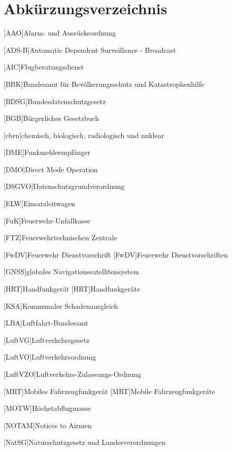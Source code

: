 \newpage
\section{Abkürzungsverzeichnis}

\begin{acronym}[EuGH]

[AAO]{Alarm- und Ausrückeordnung}

[ADS-B]{Automatic Dependent Surveillance - Broadcast}

[AIC]{Flugberatungsdienst}

[BBK]{Bundesamt für Bevölkerungsschutz und Katastrophenhilfe}

[BDSG]{Bundesdatenschutzgesetz}

[BGB]{Bürgerliches Gesetzbuch}

[cbrn]{chemisch, biologisch, radiologisch und nuklear}

[DME]{Funkmeldeempfänger}

[DMO]{Direct Mode Operation}

[DSGVO]{Datenschutzgrundverordnung}

[ELW]{Einsatzleitwagen}

[FuK]{Feuerwehr-Unfallkasse}

[FTZ]{Feuerwehrtechnischen Zentrale}

[FwDV]{Feuerwehr Dienstvorschrift}
[FwDV]{Feuerwehr Dienstvorschriften}

[GNSS]{globales Navigationssatellitensystem}

[HRT]{Handfunkgerät}
[HRT]{Handfunkgeräte}

[KSA]{Kommunaler Schadenausgleich}

[LBA]{Luftfahrt-Bundesamt}

[LuftVG]{Luftverkehrsgesetz}

[LuftVO]{Luftverkehrsordnung}

[LuftVZO]{Luftverkehrs-Zulassungs-Ordnung}

[MRT]{Mobiles Fahrzeugfunkgerät}
[MRT]{Mobile Fahrzeugfunkgeräte}

[MOTW]{Höchstabflugmasse}

[NOTAM]{Notices to Airmen}

[NatSG]{Naturschutzgesetz und Landesverordnungen}


\end{acronym}
